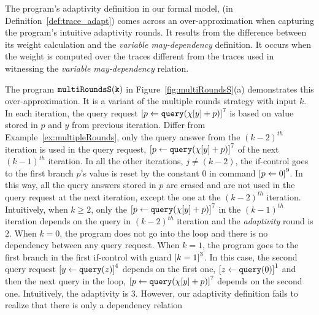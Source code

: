 \begin{example}
    \label{ex:multiRoundsS}
    The program's adaptivity definition in our formal model,
    (in Definition~\ref{def:trace_adapt})
    comes across an over-approximation when capturing the program's intuitive adaptivity rounds.
    It results from the difference between its weight calculation and the \emph{variable may-dependency} definition.
    It occurs when the weight is computed over the traces different from the traces used in 
    witnessing the \emph{variable may-dependency} relation.
    
    The program $\mathtt{multiRoundsS(k)}$ in Figure~\ref{fig:multiRoundsS}(a) demonstrates this over-approximation.
    It is a variant of the multiple rounds strategy with input $k$.
    In each iteration, the query request $\clabel{\assign{p}{\query(\chi[y]+p)} }^{7}$ is based on value stored in $p$ and $y$ from previous iteration.
    Differ from Example~\ref{ex:multipleRounds},
    only the query answer from the $(k - 2)^{th}$ iteration is used in the query request, $\clabel{\assign{p}{\query(\chi[y]+p)} }^{7}$ of the next $(k - 1)^{th}$ iteration.
    In all the other iterations, $j \neq (k - 2)$, the if-control goes to the first branch
    $p$'s value is reset by the constant $0$ in command $ \clabel{\assign{p}{0}}^{9}$.
    In this way, all the query answers stored in $p$ are erased and are not used
    in the query request at the next iteration, except the one at the $(k - 2)^{th}$ iteration.
    Intuitively, when $k \geq 2$, only the $\clabel{\assign{p}{\query(\chi[y]+p)} }^{7}$ in the $(k - 1)^{th}$ iteration
    depends on the query in $(k - 2)^{th}$ iteration and the \emph{adaptivity} round is $2$.
    When $k = 0$, the program does not go into the loop and there is no dependency between any query request.
    When $k = 1$, the program goes to the first branch in the first if-control with guard $\clabel{ k = 1}^{3}$.
    In this case, the second query request $ \clabel{ \assign{y}{\query(z)}}^{4}$ depends on the first one,
    $\clabel{\assign{z}{\query(0)} }^{1}$ and then the next query in the loop, $\clabel{\assign{p}{\query(\chi[y]+p)} }^{7}$ depends on the second one. Intuitively, the adaptivity is $3$.
    However, our adaptivity definition fails to realize that there is only a dependency relation 

\end{example}
